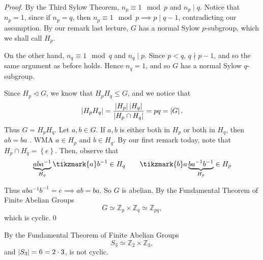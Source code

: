 \documentclass[notoc,notitlepage]{tufte-book}
\begin{document}
\begin{proof}
  By the Third Sylow Theorem, $n_p \equiv 1 \mod p$ and $n_p \mid q$. Notice that $n_p = 1$,
  since if $n_p = q$, then $n_p \equiv 1 \mod p \implies p \mid q - 1$, contradicting our
  assumption. By our remark last lecture, $G$ has a normal Sylow $p$-subgroup, which we shall
  call $H_p$.

  On the other hand, $n_q \equiv 1 \mod q$ and $n_q \mid p$. Since $p < q$, $q \nmid p - 1$,
  and so the same argument as before holds. Hence $n_q = 1$, and so $G$ has a normal Sylow
  $q$-subgroup.

  Since $H_p \triangleleft G$, we know that $H_p H_q \leq G$, and we notice that
  \begin{equation*}
    \left| H_p H_q \right| = \frac{\left| H_p \right| \left| H_q \right|}{\left| H_p \cap H_q \right|} = pq = \left| G \right|.
  \end{equation*}
  Thus $G = H_p H_q$. Let $a, b \in G$. If $a, b$ is either both in $H_p$ or both in $H_q$,
  then $ab = ba$ .
  WMA $a \in H_p$ and $b \in H_q$. By our first remark today, note that 
  $H_p \cap H_q = \left\{ e \right\}$. Then, observe that
  \begin{equation*}
    \underbrace{aba^{-1}}_{H_q} \tikzmark{a}b^{-1} \in H_q 
    \qquad \tikzmark{b}a \underbrace{ba^{-1}b^{-1}}_{H_p} \in H_p
  \end{equation*}
  Thus $aba^{-1}b^{-1} = e \implies ab = ba$. So $G$ is abelian. By the Fundamental Theorem
  of Finite Abelian Groups
  \begin{equation*}
    G \simeq \mathbb{Z}_p \times \mathbb{Z}_q \simeq \mathbb{Z}_{pq},
  \end{equation*}
  which is cyclic.\qed\
\end{proof}

\begin{eg}
  By the Fundamental Theorem of Finite Abelian Groups
  \begin{equation*}
    S_3 \simeq \mathbb{Z}_2 \times \mathbb{Z}_3,
  \end{equation*}
  and $\left| S_3 \right| = 6 = 2 \cdot 3$, is not cyclic.
\end{eg}
\end{document}
